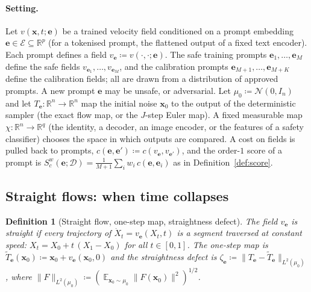 \documentclass{article}
\DeclareMathOperator{\E}{\mathbb{E}}
\newcommand{\RR}{\mathbb{R}}
\newcommand{\cD}{\mathcal{D}}                       %
\newcommand{\bx}{\mathbf{x}}
\newcommand{\be}{\mathbf{e}}                       %
\theoremstyle{plain}
\newtheorem{definition}{Definition}
\begin{document}
\paragraph{Setting.}
Let $v(\bx,t;\be)$ be a trained velocity field conditioned on a prompt embedding
$\be\in\mathcal{E}\subseteq\RR^p$ (for a tokenised prompt, the flattened output of a fixed text
encoder). Each prompt defines a field $v_{\be}\coloneqq v(\cdot,\cdot;\be)$. The safe training
prompts $\be_1,\dots,\be_M$ define the safe fields $v_{\be_1},\dots,v_{\be_M}$, and the calibration
prompts $\be_{M+1},\dots,\be_{M+K}$ define the calibration fields; all are drawn from a distribution
of approved prompts. A new prompt $\be$ may be unsafe, or adversarial. Let
$\mu_0\coloneqq\mathcal{N}(0,I_n)$ and let $T_{\be}:\RR^n\to\RR^n$ map the initial noise $\bx_0$ to the
output of the deterministic sampler (the exact flow map, or the $J$-step Euler map). A fixed
measurable map $\chi:\RR^n\to\RR^q$ (the identity, a decoder, an image encoder, or the features of
a safety classifier) chooses the space in which outputs are compared. A cost on fields is pulled
back to prompts, $c(\be,\be')\coloneqq c(v_{\be},v_{\be'})$, and the order-$1$ score of a prompt is
$S^w_c(\be;\cD)=\frac{1}{M+1}\sum_iw_i\,c(\be,\be_i)$ as in Definition~\ref{def:score}.

\subsection{Straight flows: when time collapses}\label{subsec:straight}

\begin{definition}[Straight flow, one-step map, straightness defect]\label{def:straight}
The field $v_{\be}$ is \emph{straight} if every trajectory of $\dot X_t=v_{\be}(X_t,t)$ is a segment
traversed at constant speed: $X_t=X_0+t\,(X_1-X_0)$ for all $t\in[0,1]$. The \emph{one-step map}
is $\tilde T_{\be}(\bx_0)\coloneqq\bx_0+v_{\be}(\bx_0,0)$ and the \emph{straightness defect} is
$\zeta_{\be}\coloneqq\|T_{\be}-\tilde T_{\be}\|_{L^2(\mu_0)}$, where
$\|F\|_{L^2(\mu_0)}\coloneqq(\E_{\bx_0\sim\mu_0}\|F(\bx_0)\|^2)^{1/2}$.
\end{definition}
\end{document}
